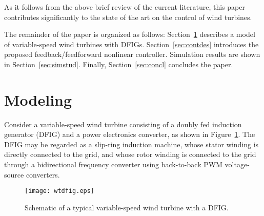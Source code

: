 \documentclass[journal]{IEEEtran}
\begin{document}
As it follows from the above brief review of the current literature, this paper contributes significantly to the state of the art on the control of wind turbines.

The remainder of the paper is organized as follows: Section~\ref{sec:mod} describes a model of variable-speed wind turbines with DFIGs. Section~\ref{sec:contdes} introduces the proposed feedback/feedforward nonlinear controller. Simulation results are shown in Section~\ref{sec:simstud}. Finally, Section~\ref{sec:concl} concludes the paper.

\section{Modeling}\label{sec:mod}

Consider a variable-speed wind turbine consisting of a doubly fed induction generator (DFIG) and a power electronics converter, as shown in Figure~\ref{fig:wtdfig}. The DFIG may be regarded as a slip-ring induction machine, whose stator winding is directly connected to the grid, and whose rotor winding is connected to the grid through a bidirectional frequency converter using back-to-back PWM voltage-source converters.

\begin{figure}[tb]
\centering\texttt{[image: wtdfig.eps]}
\caption{Schematic of a typical variable-speed wind turbine with a DFIG.}
\label{fig:wtdfig}
\end{figure}
\end{document}
